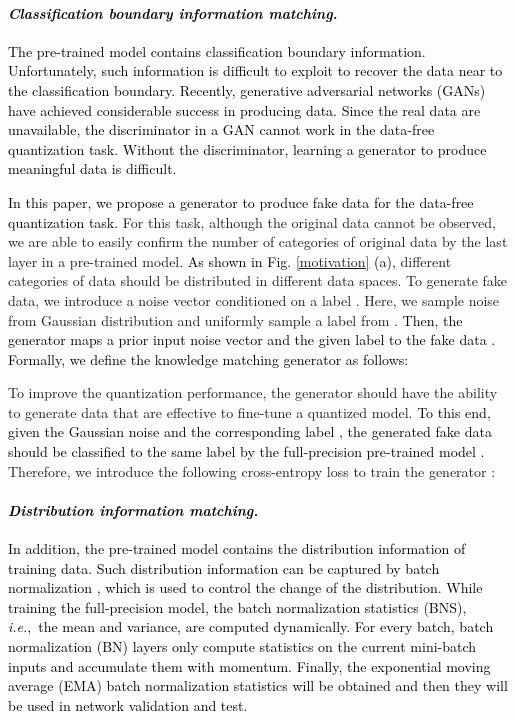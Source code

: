 \documentclass[runningheads]{llncs}
\def\ie{\emph{i.e}\onedot}
\def\ie{\mbox{\textit{i.e.}, }}
\def\xsk{\textcolor{black}}
\def\jie{\textcolor{black}}
\def\new{\textcolor{black}}
\begin{document}
\paragraph{\emph{\textbf{\jie{Classification boundary information matching.}}}}
\jie{
The pre-trained model contains classification boundary information.
Unfortunately, such information is \new{difficult} to \new{exploit} to recover the data \new{near to} the classification boundary. 
Recently, generative adversarial networks (GANs) \cite{goodfellow2014generative,cao2018adversarial,cao2019multi} have achieved considerable success \new{in producing} data.
\new{Since the real data are unavailable, the discriminator in a GAN cannot work in the data-free quantization task.}
Without the discriminator, \new{learning a generator to produce meaningful data is difficult.}
}

\jie{In this paper, we propose a generator to produce fake data for \new{the} data-free quantization task.}
For this task, although the original data cannot be observed, we are able to easily confirm the number of categories of original data by the last layer in a pre-trained model.
\jie{As shown in Fig. \ref{motivation} (a),} different categories of data should be distributed in different data spaces.
To generate fake data, we introduce a noise vector  conditioned on a label .
Here, we sample noise from Gaussian distribution  and uniformly sample a label from .
\jie{Then, the generator maps a prior input noise vector  and the given label  to \new{the} fake data .
Formally, we define the knowledge matching generator as follows:}

To improve the quantization performance, the generator should have the ability to generate data that are effective to fine-tune a quantized model.
\jie{To this \new{end}, given the Gaussian noise  and the corresponding label , the generated fake data should be classified to the same label  by the full-precision pre-trained model .}
Therefore, we introduce the following cross-entropy loss  to train the generator :


\paragraph{\emph{\textbf{\jie{Distribution information matching.}}}}
\jie{
\new{In addition}, the pre-trained model contains the distribution information of training data.
Such distribution information can be captured by batch normalization \cite{ioffe2015batch}, which is used to control the change of the distribution.
\xsk{While training the full-precision model, the batch normalization statistics (BNS), \ie the mean and variance, are computed dynamically.
For every batch, batch normalization (BN) layers only compute statistics on the current mini-batch inputs and accumulate them with  momentum.
\new{Finally}, the exponential moving average (EMA) batch normalization statistics will be obtained and then they will be used in network validation and test.}
}
\end{document}
